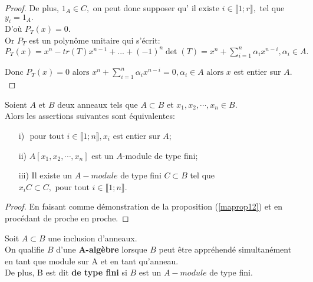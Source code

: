 \begin{proof}
	De plus, $1_A\in C,$ on peut donc supposer qu' $\text{il existe } i\in \llbracket 1; r \rrbracket ,$ tel que $y_{i}=1_A.$\\
	D'où $P_{T}(x)=0.$\\
	Or $P_{T}$ est un polynôme unitaire qui s'écrit:\\ $P_{T}(x)=x^{n}-tr(T)x^{n-1}+...+(-1)^{n}\det
	(T)=x^{n}+\sum\limits_{i=1}^{n}\alpha _{i}x^{n-i},\alpha _{i}\in A.$
	
	Donc $P_{T}(x)=0\text{ alors } x^{n}+\sum\limits_{i=1}^{n}\alpha
	_{i}x^{n-i}=0,\alpha _{i}\in A\text{ alors } x$ est entier sur $A.$
	
\end{proof}
\begin{moncorollaire}
	Soient $A$ et $B$ deux anneaux tels que $A \subset  B$ et $x_1, x_2, \cdots, x_n \in B$.\\
	Alors les assertions suivantes sont équivalentes:
	\begin{enumerate}
		\item[i)]$\text{ pour tout } i \in \llbracket 1; n \rrbracket, x_i$ est entier sur $A$;
		\item[ii)]$A[x_1, x_2, \cdots, x_n]$ est un $A$-module de type fini;
		\item[iii)]Il existe un $A-module$ de type fini $C \subset  B$ tel que $x_i C \subset  C, \text{ pour tout } i \in \llbracket 1; n \rrbracket$.
	\end{enumerate}
\end{moncorollaire}
\begin{proof}
	En faisant comme démonstration de la proposition (\ref{maprop12}) et en procédant de proche en proche. 
\end{proof}

\begin{madefinition}
	Soit $A \subset B$ une inclusion d'anneaux.\\
	On qualifie $B$ d'une \textbf{A-algèbre} lorsque $B$ peut être appréhendé simultanément en tant que module sur A et en tant qu'anneau.\\
	De plus, B est dit \textbf{de type fini} si $B$ est un $A-module$ de type fini.
\end{madefinition}

